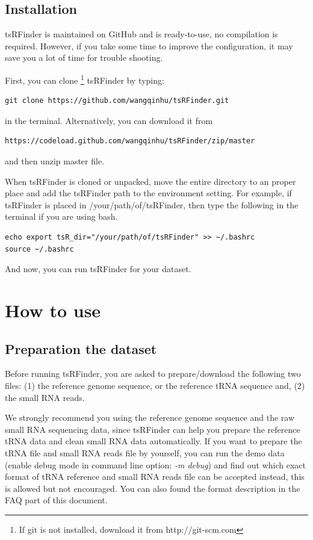 \documentclass[11pt, a4paper]{article}
\begin{document}
\subsection{Installation}

tsRFinder is maintained on GitHub and is ready-to-use, no compilation is required. However, if you take some time to improve the configuration, it may save you a lot of time for trouble shooting.

First, you can clone \footnote{If git is not installed, download it from http://git-scm.com} tsRFinder by typing:

{\small \begin{verbatim}
git clone https://github.com/wangqinhu/tsRFinder.git
\end{verbatim}}

in the terminal. Alternatively, you can download it from

{\small \begin{verbatim}
https://codeload.github.com/wangqinhu/tsRFinder/zip/master
\end{verbatim}
}

and then unzip master file.

When tsRFinder is cloned or unpacked, move the entire directory to an proper place and add the tsRFinder path to the environment setting. For example, if tsRFinder is placed in /your/path/of/tsRFinder, then type the following in the terminal if you are using bash.

{\small \begin{verbatim}
echo export tsR_dir="/your/path/of/tsRFinder" >> ~/.bashrc
source ~/.bashrc
\end{verbatim}}

And now, you can run tsRFinder for your dataset.

\section{How to use}

\subsection{Preparation the dataset}

Before running tsRFinder, you are asked to prepare/download the following two files: (1) the reference genome sequence, or the reference tRNA sequence and, (2) the small RNA reads.

We strongly recommend you using the reference genome sequence and the raw small RNA sequencing data, since tsRFinder can help you prepare the reference tRNA data and clean small RNA data automatically. If you want to prepare the tRNA file and small RNA reads file by yourself, you can run the demo data (enable debug mode in command line option: \emph{-m debug}) and find out which exact format of tRNA reference and small RNA reads file can be accepted instead, this is allowed but not encouraged. You can also found the format description in the FAQ part of this document.
\end{document}
